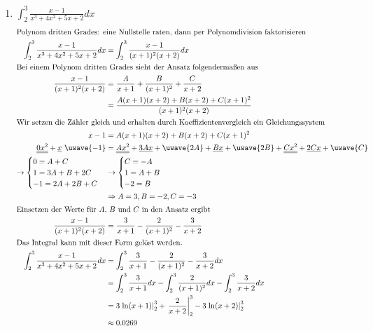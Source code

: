 \documentclass[11pt, a4paper]{article}
\begin{document}
\begin{enumerate}
	\item $\displaystyle \int_2^3 \frac{x-1}{x^3 + 4x^2 + 5x + 2} dx$ %
	\begin{align*}
		\intertext{Polynom dritten Grades: eine Nullstelle raten, dann per Polynomdivision faktorisieren}
		\int_2^3 \frac{x-1}{x^3 + 4x^2 + 5x + 2} dx &= \int_2^3 \frac{x-1}{(x+1)^2 (x+2)} dx \\
		\intertext{Bei einem Polynom dritten Grades sieht der Ansatz folgendermaßen aus}
		\frac{x-1}{(x+1)^2 (x+2)} &= \frac{A}{x+1} + \frac{B}{(x+1)^2} + \frac{C}{x+2} \\
		&= \frac{A(x+1)(x+2) + B(x+2) + C(x+1)^2}{(x+1)^2 (x+2)} \\
		\intertext{Wir setzen die Zähler gleich und erhalten durch Koeffizientenvergleich ein Gleichungssystem}
		x-1 &= A(x+1)(x+2) + B(x+2) + C(x+1)^2 \\
		\underline{\underline{0x^2}} + \underline{x} \ \uwave{- 1} &=
		\underline{\underline{Ax^2}} + \underline{3Ax} + \uwave{2A} + \underline{Bx} + \uwave{2B} + \underline{\underline{Cx^2}} + \underline{2Cx} + \uwave{C} \\
		\rightarrow \begin{cases}
			0 = A + C \\
			1 = 3A + B + 2C \\
			-1 = 2A + 2B + C
		\end{cases}
		&\rightarrow \begin{cases}
			C = -A \\
			1 = A + B \\
			-2 = B
		\end{cases} \\
		&\Rightarrow A=3, B=-2, C=-3 \\
		\intertext{Einsetzen der Werte für $A$, $B$ und $C$ in den Ansatz ergibt}
		\frac{x-1}{(x+1)^2 (x+2)} &= \frac{3}{x+1} - \frac{2}{(x+1)^2} - \frac{3}{x+2} \\
		\intertext{Das Integral kann mit dieser Form gelöst werden.}
		\int_2^3 \frac{x-1}{x^3 + 4x^2 + 5x + 2} dx &= \int_2^3 \frac{3}{x+1} - \frac{2}{(x+1)^2} - \frac{3}{x+2} dx \\
		&= \int_2^3 \frac{3}{x+1} dx - \int_2^3 \frac{2}{(x+1)^2} dx - \int_2^3 \frac{3}{x+2} dx \\
		&= 3 \left. \ln(x+1) \right|_2^3 + \left. \frac{2}{x+2} \right|_2^3 - 3 \left. \ln(x+2) \right|_2^3 \\
		&\approx 0.0269
	\end{align*}
\end{enumerate}
\end{document}
